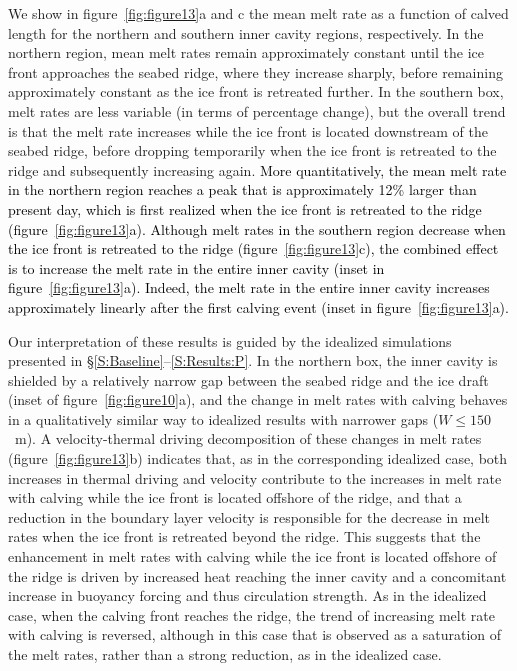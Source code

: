 \documentclass[draft]{agujournal2019}
\newcommand{\blue}[1]{\textcolor{blue}{#1}}
\renewcommand{\blue}[1]{{\textcolor{black}{#1}}} %
\begin{document}
We show in figure~\ref{fig:figure13}a and c the mean melt rate as a function of calved length for the northern and southern inner cavity regions, respectively. In the northern region, mean melt rates remain approximately constant until the ice front approaches the seabed ridge, where they increase sharply, before remaining approximately constant as the ice front is retreated further. In the southern box, melt rates are less variable (in terms of percentage change), but the overall trend is that the melt rate increases while the ice front is located downstream of the seabed ridge, before dropping temporarily when the ice front is retreated to the ridge and subsequently increasing again.  \blue{More quantitatively, the mean melt rate in the northern region reaches a peak that is approximately 12\% larger than present day, which is first realized when the ice front is retreated to the ridge (figure~\ref{fig:figure13}a). Although melt rates in the southern region decrease when the ice front is retreated to the ridge (figure~\ref{fig:figure13}c), the combined effect is to increase the melt rate in the entire inner cavity (inset in figure~\ref{fig:figure13}a). Indeed, the melt rate in the entire inner cavity increases approximately linearly after the first calving event (inset in figure~\ref{fig:figure13}a).}



Our interpretation of these results is guided by the idealized simulations presented in \S\ref{S:Baseline}--\ref{S:Results:P}. In the northern box, the inner cavity is shielded by a relatively narrow gap between the seabed ridge and the ice draft (inset of figure~\ref{fig:figure10}a), and the change in melt rates with calving behaves in a qualitatively similar way to idealized results with narrower gaps ($W\leq150$~m). A velocity-thermal driving decomposition of these changes in melt rates (figure~\ref{fig:figure13}b) indicates that, as in the corresponding idealized case, both increases in thermal driving and velocity contribute to the increases in melt rate with calving while the ice front is located offshore of the ridge, and that a reduction in the boundary layer velocity is responsible for the decrease in melt rates when the ice front is retreated beyond the ridge. This suggests that the enhancement in melt rates with calving while the ice front is located offshore of the ridge is driven by increased heat reaching the inner cavity and a concomitant increase in buoyancy forcing and thus circulation strength. As in the idealized case, when the calving front reaches the ridge, the trend of increasing melt rate with calving is reversed, although in this case that is observed as a saturation of the melt rates, rather than a strong reduction, as in the idealized case.
\end{document}
